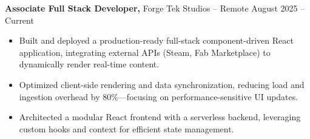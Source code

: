 \documentclass[11pt]{article}       %
\begin{document}
\textbf{Associate Full Stack Developer,} {Forge Tek Studios} -- Remote \hfill August 2025 -- Current 
\vspace{-9pt}
\begin{itemize}
  \item Built and deployed a production-ready full-stack component-driven React application, integrating external APIs (Steam, Fab Marketplace) to dynamically render real-time content.
  \item Optimized client-side rendering and data synchronization, reducing load and ingestion overhead by 80\%—focusing on performance-sensitive UI updates.
  \item Architected a modular React frontend with a serverless backend, leveraging custom hooks and context for efficient state management.
\end{itemize}

\end{document}
